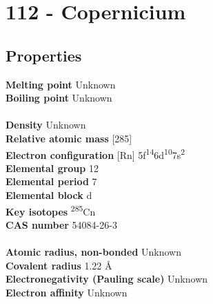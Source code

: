 \section{112 - Copernicium}
\label{sec:elem-copernicium}
\subsection{Properties}
\textbf{Melting point} Unknown\\
\textbf{Boiling point} Unknown\\
\\
\textbf{Density} Unknown\\
\textbf{Relative atomic mass} [285]\\
\textbf{Electron configuration} [Rn] 5f\textsuperscript{14}6d\textsuperscript{10}7s\textsuperscript{2}\\
\textbf{Elemental group} 12\\
\textbf{Elemental period} 7\\
\textbf{Elemental block} d\\
\textbf{Key isotopes} \textsuperscript{285}Cn\\
\textbf{CAS number} 54084-26-3\\
\\
\textbf{Atomic radius, non-bonded} Unknown\\
\textbf{Covalent radius} 1.22 Å\\
\textbf{Electronegativity (Pauling scale)} Unknown\\
\textbf{Electron affinity} Unknown\\
